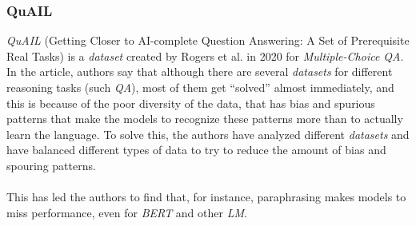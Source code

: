 \subsubsection{QuAIL}
\label{sec:quail}
\emph{QuAIL} (Getting Closer to AI-complete Question Answering: A Set of Prerequisite Real Tasks)\cite{Rogers2020} is a \emph{dataset} created by Rogers et al. in 2020 for \emph{Multiple-Choice QA}. In the article, authors say that although there are several \emph{datasets} for different reasoning tasks (such \emph{QA}), most of them get ``solved'' almost immediately, and this is because of the poor diversity of the data, that has bias and spurious patterns that make the models to recognize these patterns more than to actually learn the language. To solve this, the authors have analyzed different \emph{datasets} and have balanced different types of data to try to reduce the amount of bias and spouring patterns.
\paragraph{}
This has led the authors to find that, for instance, paraphrasing makes models to miss performance, even for \emph{BERT} and other \emph{LM}.
